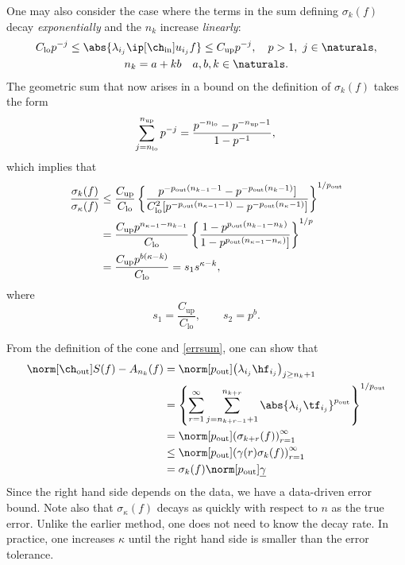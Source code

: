 \documentclass[final]{elsarticle}
\newcommand{\chin}{\ch_{\text{\rm{in}}}}
\newcommand{\chout}{\ch_{\text{\rm{out}}}}
\newcommand{\pout}{p_{\text{\rm{out}}}}
\theoremstyle{definition}
\theoremstyle{remark}
\DeclareMathOperator{\up}{up}
\DeclareMathOperator{\lo}{lo}
\begin{document}
One may also consider the case where the terms in the sum defining $\sigma_k(f)$ decay \emph{exponentially} and the $n_k$ increase \emph{linearly}:
\begin{gather*}
C_{\lo} p^{-j} \le \abs{\lambda_{i_j} \ip[\chin]{u_{i_j}}{f}} \le C_{\up} p^{-j}, \quad  p>1, \ j \in \naturals, \\
n_k = a +kb  \quad a, b, k \in \naturals.
\end{gather*}
The geometric sum that now arises in a bound on the  definition of $\sigma_k(f)$ takes the form
\begin{equation*}
\sum_{j=n_{\lo}}^{n_{\up}} p^{-j} = \frac{p^{-n_{\lo}} - p^{-n_{\up}-1}}{1-p^{-1}}, \\
\end{equation*}
which implies that
\begin{align*}
\frac{\sigma_k(f)}{\sigma_\kappa(f)} & \le
\frac{C_{\up}}  {C_{\lo}} \left\{\frac{p^{-\pout( n_{k-1}-1} - p^{- \pout(n_{k}-1)}]}  {C_{\lo}^2[p^{-\pout(n_{\kappa-1}-1)} - p^{-\pout(n_{\kappa}-1)}]}\right\}^{1/\pout} \\
& =
\frac{C_{\up} p^{n_{\kappa-1}-n_{k-1}}} {C_{\lo}}  \left\{\frac{1 - p^{\pout(n_{k-1}-n_{k})}} {1 - p^{\pout(n_{\kappa-1}-n_{\kappa})}]} \right\}^{1/p}\\
& = \frac{ C_{\up} p^{b(\kappa-k)}}  {C_{\lo}}  = s_1 s^{\kappa-k},
\end{align*}
where
\[
s_1 = \frac{ C_{\up}}  {C_{\lo}} , \qquad s_2 = p^b.
\]

From the definition of the cone and \eqref{errsum}, one can show that
\begin{align*}
\norm[\chout]{S(f)-A_{n_k}(f)} &= \norm[\pout]{\left(\lambda_{i_j} \hf_{i_j} \right)_{j\ge n_k+1}} \\
&= \left\{\sum_{r=1}^\infty \sum_{j=n_{k+r-1}+1}^{n_{k+r}}  \abs{\lambda_{i_j}\tf_{i_j} }^{\pout}  \right\}^{1/\pout}\\
&= \norm[\pout]{ \left(\sigma_{k+r}(f)\right)_{r=1}^{\infty}} \\
&\le \norm[\pout]{ \left(\gamma(r)\sigma_{k}(f)\right)_{r=1}^{\infty}} \\
&= \sigma_{k}(f)\norm[\pout]{\underline{\gamma}} \\
\end{align*}
Since the right hand side depends on the data, we have a data-driven error bound.  Note also that $\sigma_\kappa(f)$ decays as quickly with respect to $n$ as the true error.  Unlike the earlier method, one does not need to know the decay rate.  In practice, one increases $\kappa$ until the right hand side is smaller than the error tolerance.
\end{document}
